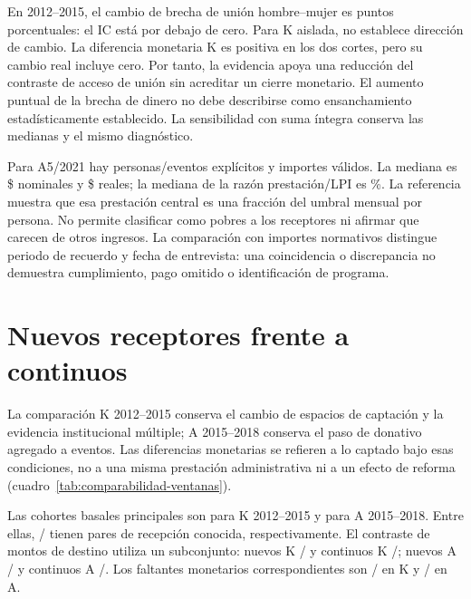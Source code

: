 
\FloatBarrier

En 2012--2015, el cambio de brecha de unión hombre--mujer es
 puntos porcentuales: el IC está por debajo de cero.
Para K aislada,  no establece dirección de cambio.
La diferencia monetaria K es positiva en los dos cortes, pero su cambio real
 incluye cero. Por tanto, la evidencia apoya una reducción
del contraste de acceso de unión sin acreditar un cierre monetario.
El aumento puntual de la brecha de dinero no debe describirse como
ensanchamiento estadísticamente establecido. La sensibilidad con suma
íntegra conserva las medianas y el mismo diagnóstico.

Para A5/2021 hay  personas/eventos explícitos y
 importes válidos. La mediana es \$
nominales y \$ reales; la mediana de la razón prestación/LPI
es \%. La referencia muestra que esa prestación central es
una fracción del umbral mensual por persona. No permite clasificar como
pobres a los receptores ni afirmar que carecen de otros ingresos. La
comparación con importes normativos distingue periodo de recuerdo y fecha
de entrevista: una coincidencia o discrepancia no demuestra cumplimiento,
pago omitido o identificación de programa.

\section{Nuevos receptores frente a continuos}

La comparación K 2012--2015 conserva el cambio de espacios de captación
y la evidencia institucional múltiple; A 2015--2018 conserva el paso de
donativo agregado a eventos. Las diferencias monetarias se refieren
a lo captado bajo esas condiciones, no a una misma prestación administrativa
ni a un efecto de reforma (cuadro~\ref{tab:comparabilidad-ventanas}).
\label{sec:resultados-incorporacion}

Las cohortes basales principales son  para K 2012--2015 y
 para A 2015--2018. Entre ellas,
/ tienen pares de recepción conocida,
respectivamente. El contraste de montos de destino utiliza un subconjunto:
nuevos K / y continuos K
/; nuevos A
/ y continuos A
/.
Los faltantes monetarios correspondientes son
/ en K y
/ en A.

